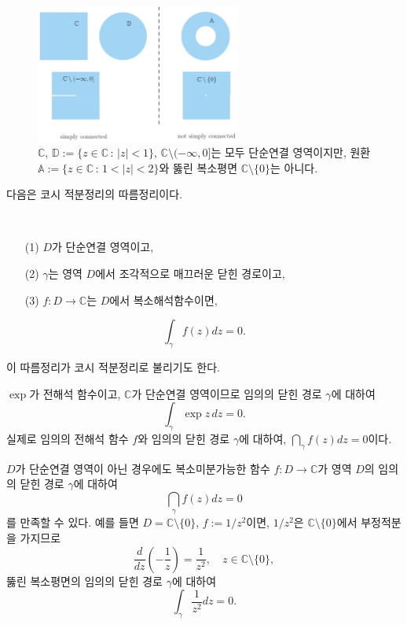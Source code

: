 
\begin{figure}[!h]
\begin{center}
\includegraphics[width=0.6\textwidth]{./SaltChapter/figs/fig-3-13}
\end{center}
\caption{$\mathbb C$, $\mathbb D:=\{z\in\mathbb C\,:\, |z|<1\}$,
$\mathbb C\setminus(-\infty,0]$는 모두 단순연결 영역이지만,
원환 $\mathbb A:= \{ z\in\mathbb C \,:\,  1<|z|<2 \}$와 
뚫린 복소평면 $\mathbb C\setminus \{0\}$는 아니다.}
\label{fig-3-13}
\end{figure}

다음은 코시 적분정리의 따름정리이다.

\begin{salt_corollary} \label{coro-3-2}
\
\begin{itemize}
\item[(1)] $D$가 단순연결 영역이고,
\item[(2)] $\gamma$는 영역 $D$에서 조각적으로 매끄러운 닫힌 경로이고,
\item[(3)] $f:D\to\mathbb C$는 $D$에서 복소해석함수이면,
\end{itemize}
\[
\int_\gamma f(z)dz = 0.
\]
\end{salt_corollary}

이 따름정리가 코시 적분정리로 불리기도 한다.

\begin{saltexample} [label=example-3-9]{}{}
$\exp$가 전해석 함수이고, $\mathbb C$가 단순연결 영역이므로
임의의 닫힌 경로 $\gamma$에 대하여
\[
\int_\gamma \exp z \, dz = 0.
\]
실제로 임의의 전해석 함수 $f$와 임의의 닫힌 경로 $\gamma$에 대하여, $\dint_\gamma f(z)dz=0$이다.
\end{saltexample}

$D$가 단순연결 영역이 아닌 경우에도 복소미분가능한 함수 $f:D\to \mathbb C$가
영역 $D$의 임의의 닫힌 경로 $\gamma$에 대하여
\[
\dint_\gamma f(z)dz=0
\]
를 만족할 수 있다.
예를 들면 $D=\mathbb C\setminus \{0\}$, $f:=1/z^2$이면,
$1/z^2$은 $\mathbb C\setminus \{0\}$에서 부정적분을 가지므로
\[
\dfrac d{dz}\left(- \dfrac 1z\right) = \dfrac1{z^2}, \quad z\in \mathbb C\setminus \{0\},
\]
뚫린 복소평면의 임의의 닫힌 경로 $\gamma$에 대하여
\[
\int_\gamma \dfrac 1{z^2}dz=0.
\]

